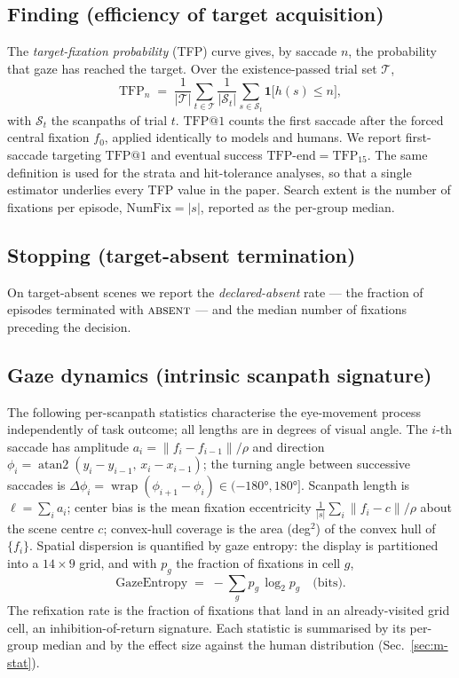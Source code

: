 \documentclass[runningheads]{llncs}
\begin{document}
\subsection{Finding (efficiency of target acquisition)}\label{sec:m-find}
The \emph{target-fixation probability} (TFP) curve gives, by saccade $n$, the probability that gaze has
reached the target. Over the existence-passed trial set $\mathcal T$,
\begin{equation}
\mathrm{TFP}_n \;=\; \frac{1}{|\mathcal T|}\sum_{t\in\mathcal T}
   \frac{1}{|\mathcal S_t|}\sum_{s\in\mathcal S_t}\mathbf 1\!\big[h(s)\le n\big],
\label{eq:tfp}
\end{equation}
with $\mathcal S_t$ the scanpaths of trial $t$. $\mathrm{TFP@1}$ counts the first saccade after the forced central fixation $f_0$, applied identically to models and humans. We report first-saccade targeting $\mathrm{TFP@1}$ and
eventual success $\mathrm{TFP\text{-}end}=\mathrm{TFP}_{15}$. The same definition is used for the
strata and hit-tolerance analyses, so that a single estimator underlies every TFP value in the paper.
Search extent is the number of fixations per episode, $\mathrm{NumFix}=|s|$, reported as the per-group
median.
 
\subsection{Stopping (target-absent termination)}\label{sec:m-stop}
On target-absent scenes we report the \emph{declared-absent} rate --- the fraction of episodes terminated
with $\textsc{absent}$ --- and the median number of fixations preceding the decision.
 
\subsection{Gaze dynamics (intrinsic scanpath signature)}\label{sec:m-gaze}
The following per-scanpath statistics characterise the eye-movement process independently of task
outcome; all lengths are in degrees of visual angle. The $i$-th saccade has amplitude
$a_i=\lVert f_i-f_{i-1}\rVert/\rho$ and direction $\phi_i=\operatorname{atan2}(y_i-y_{i-1},\,x_i-x_{i-1})$;
the turning angle between successive saccades is $\Delta\phi_i=\operatorname{wrap}(\phi_{i+1}-\phi_i)\in(-180°,180°]$.
Scanpath length is $\ell=\sum_i a_i$; center bias is the mean fixation eccentricity
$\tfrac{1}{|s|}\sum_i\lVert f_i-c\rVert/\rho$ about the scene centre $c$; convex-hull coverage is the area
(deg$^2$) of the convex hull of $\{f_i\}$. Spatial dispersion is quantified by gaze entropy: the display
is partitioned into a $14{\times}9$ grid, and with $p_g$ the fraction of fixations in cell $g$,
\begin{equation}
\mathrm{GazeEntropy} \;=\; -\sum_{g} p_g\,\log_2 p_g \quad\text{(bits)}.
\label{eq:entropy}
\end{equation}
The refixation rate is the fraction of fixations that land in an already-visited grid cell, an
inhibition-of-return signature. Each statistic is summarised by its per-group median and by the effect
size against the human distribution (Sec.~\ref{sec:m-stat}).
 
\end{document}
